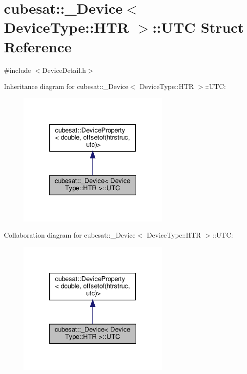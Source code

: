 \hypertarget{structcubesat_1_1__Device_3_01DeviceType_1_1HTR_01_4_1_1UTC}{}\section{cubesat\+:\+:\+\_\+\+Device$<$ Device\+Type\+:\+:H\+TR $>$\+:\+:U\+TC Struct Reference}
\label{structcubesat_1_1__Device_3_01DeviceType_1_1HTR_01_4_1_1UTC}


{\ttfamily \#include $<$Device\+Detail.\+h$>$}



Inheritance diagram for cubesat\+:\+:\+\_\+\+Device$<$ Device\+Type\+:\+:H\+TR $>$\+:\+:U\+TC\+:\nopagebreak
\begin{figure}[H]
\begin{center}
\leavevmode
\includegraphics[width=213pt]{structcubesat_1_1__Device_3_01DeviceType_1_1HTR_01_4_1_1UTC__inherit__graph}
\end{center}
\end{figure}


Collaboration diagram for cubesat\+:\+:\+\_\+\+Device$<$ Device\+Type\+:\+:H\+TR $>$\+:\+:U\+TC\+:\nopagebreak
\begin{figure}[H]
\begin{center}
\leavevmode
\includegraphics[width=213pt]{structcubesat_1_1__Device_3_01DeviceType_1_1HTR_01_4_1_1UTC__coll__graph}
\end{center}
\end{figure}
